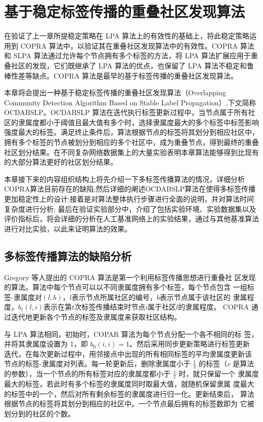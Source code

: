 \chapter{基于稳定标签传播的重叠社区发现算法}

在验证了上一章所提稳定策略在 LPA 算法上的有效性的基础上，将此稳定策略运用到 COPRA 算法中，以验证其在重叠社区发现算法中的有效性。COPRA 算法\cite{Gregory2009Finding}和 SLPA 算法\cite{Xie2012SLPA}通过允许每个节点拥有多个标签的方法，将 LPA 算法扩展应用于重叠社区的发现，它们既继承了 LPA 算法的优点，也保留了 LPA 算法不稳定和鲁棒性差等缺点。COPRA 算法是最早的基于标签传播的重叠社区发现算法。

本章将会提出一种基于稳定标签传播的重叠社区发现算法（Overlapping Community Detection Algorithm Based on Stable Label Propagation）,下文简称 OCDABSLP。OCDABSLP 算法在迭代执行标签更新过程中，当节点属于所有社区的隶属度都小于阈值且最大值有多个时，选择隶属度最大的多个标签中标签影响强度最大的标签。满足终止条件后，算法根据节点的标签将其划分到相应社区中，拥有多个标签的节点被划分到相应的多个社区中，成为重叠节点，得到最终的重叠社区划分结果。在不同复杂网络数据集上的大量实验表明本章算法能够得到比现有的大部分算法更好的社区划分结果。

本章接下来的内容组织结构上将先介绍一下多标签传播算法的情况，详细分析COPRA算法目前存在的缺陷;然后详细的阐述OCDABSLP算法在使得多标签传播更加稳定性上的设计;接着是对算法整体执行步骤进行全面的说明，并对算法时间复杂度进行分析; 最后在验证实验部分中，介绍了包括实验环境、实验数据集以及评价指标后，将会详细的分析在人工基准网络上的实验结果，通过与其他基准算法进行对比实验，以此来证明算法的效果。

\section{多标签传播算法的缺陷分析}

Gregory 等人\cite{Gregory2009Finding}提出的 COPRA 算法是第一个利用标签传播思想进行重叠社
区发现的算法。算法中每个节点可以以不同隶属度拥有多个标签，每个节点包含
一组标签-隶属度对$(l, b)$，$l $表示节点所属社区的编号，$b $表示节点属于该社区的
隶属程度，$b_t(l, i)$表示在第$ t $次标签传播结束时节点$ i $属于社区$ l $的隶属程度。
COPRA 通过迭代地更新各个节点的标签及隶属度来获取社区结构。

与 LPA 算法相同，初始时，COPAR 算法为每个节点分配一个各不相同的标
签，并将其隶属度设置为 1，即 $b_0(i, i) = 1$。然后采用同步更新策略进行标签更新
迭代，在每次更新过程中，用邻接点中出现的所有相同标签的平均隶属度更新该
节点的标签-隶属度对列表。每一轮更新后，删除隶属度小于 $\frac{1}{v}$ 的标签（$v$ 是算法的参数），当一个节点的所有标签对应的隶属度都小于 $\frac{1}{v}$ 时，就只保留一个
隶属度最大的标签，若此时有多个标签的隶属度同时取最大值，就随机保留隶属
度最大的标签中的一个，然后对所有剩余标签的隶属度进行归一化。更新结束后，
算法根据节点的标签将其划分到相应的社区中。一个节点最后拥有的标签数即为
它被划分到的社区的个数。 

